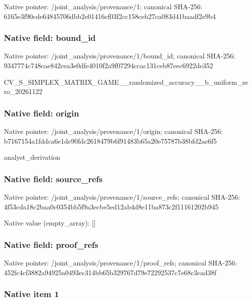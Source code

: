 \documentclass[10pt,a4paper]{article}
\begin{document}
Native pointer: /joint\_analysis/provenance/1; canonical SHA-256: 6165e3f90cde64845706dbb2\allowbreak{}e01416cf03f2cc158ceb27ca\allowbreak{}083d41baadf2e9b4



\subsubsection{Native field: bound\_id}


Native pointer: /joint\_analysis/provenance/1/bound\_id; canonical SHA-256: 9347774c748cae842cea3e0d\allowbreak{}fe4010f2a9f07294ccac131c\allowbreak{}eb87eec6922de352


CV\_S\_SIMPLEX\_MATRIX\_GAME\allowbreak{}\_\_randomized\_accuracy\_\_b\allowbreak{}\_uniform\_zero\_20261122


\subsubsection{Native field: origin}


Native pointer: /joint\_analysis/provenance/1/origin; canonical SHA-256: b7167154a1fddca6e1de90fd\allowbreak{}c2618479b6f91483b65a20e7\allowbreak{}5787b38bfd2ae6f5


analyst\_derivation


\subsubsection{Native field: source\_refs}


Native pointer: /joint\_analysis/provenan\allowbreak{}ce/1/source\_refs; canonical SHA-256: 4f53cda18c2baa0c0354bb5f\allowbreak{}9a3ecbe5ed12ab4d8e11ba87\allowbreak{}3c2f11161202b945



Native value (empty\_array): []



\subsubsection{Native field: proof\_refs}


Native pointer: /joint\_analysis/provenance/1/proof\_refs; canonical SHA-256: 452fc4cf3882a94925a0493e\allowbreak{}c314bb65b329767d79e72292\allowbreak{}537c7e68c3cad38f



\subsubsection{Native item 1}
\end{document}
